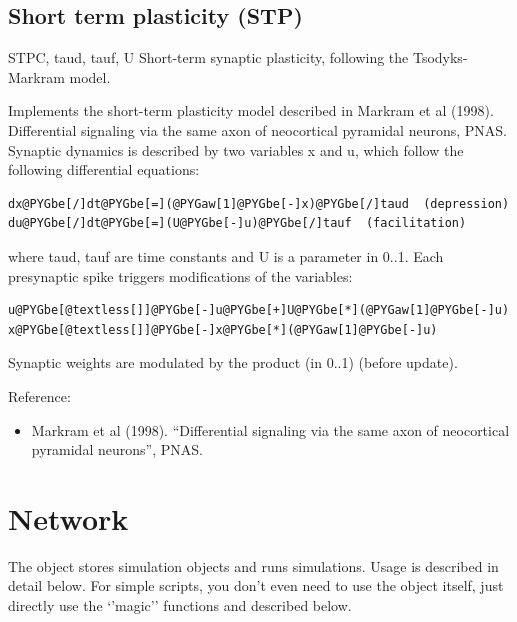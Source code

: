 \documentclass[letterpaper,10pt,english]{manual}
\begin{document}
\subsection{Short term plasticity (STP)}

\hypertarget{brian.STP}{}\begin{classdesc}{STP}{C, taud, tauf, U}
Short-term synaptic plasticity, following the Tsodyks-Markram model.

Implements the short-term plasticity model described in Markram et al (1998).
Differential signaling via the same axon of
neocortical pyramidal neurons, PNAS.
Synaptic dynamics is described by two variables x and u, which follow
the following differential equations:

\begin{Verbatim}[commandchars=@\[\]]
dx@PYGbe[/]dt@PYGbe[=](@PYGaw[1]@PYGbe[-]x)@PYGbe[/]taud  (depression)
du@PYGbe[/]dt@PYGbe[=](U@PYGbe[-]u)@PYGbe[/]tauf  (facilitation)
\end{Verbatim}

where taud, tauf are time constants and U is a parameter in 0..1. Each presynaptic
spike triggers modifications of the variables:

\begin{Verbatim}[commandchars=@\[\]]
u@PYGbe[@textless[]]@PYGbe[-]u@PYGbe[+]U@PYGbe[*](@PYGaw[1]@PYGbe[-]u)
x@PYGbe[@textless[]]@PYGbe[-]x@PYGbe[*](@PYGaw[1]@PYGbe[-]u)
\end{Verbatim}

Synaptic weights are modulated by the product  (in 0..1) (before update).

Reference:
\begin{itemize}
\item {} 
Markram et al (1998). ``Differential signaling via the same axon of
neocortical pyramidal neurons'', PNAS.

\end{itemize}
\end{classdesc}

\resetcurrentobjects


\section{Network}

The \hyperlink{brian.Network}{} object stores simulation objects and runs simulations. Usage
is described in detail below. For simple scripts, you don't even need to
use the \hyperlink{brian.Network}{} object itself, just directly use the `'magic'' functions
\hyperlink{brian.run}{} and \hyperlink{brian.reinit}{} described below.
\end{document}
